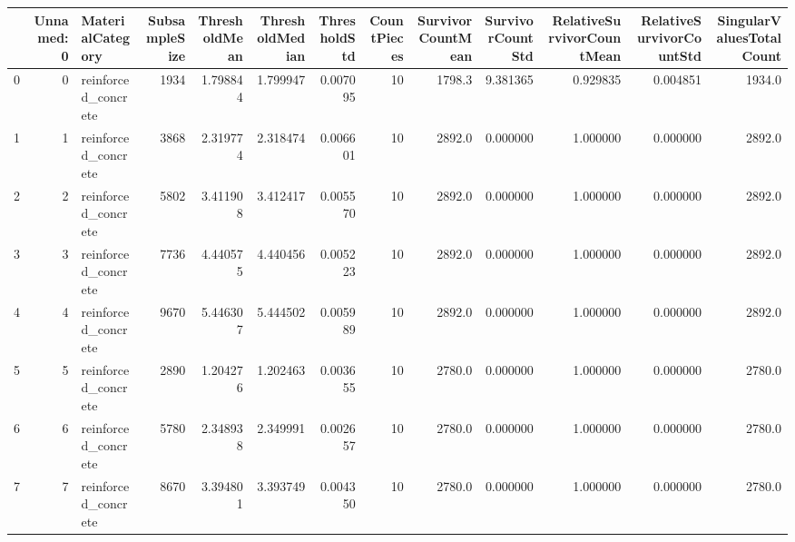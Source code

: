 \begin{tabular}{lrlrrrrrrrrrr}
\toprule
{} &  Unnamed: 0 &     MaterialCategory &  SubsampleSize &  ThresholdMean &  ThresholdMedian &  ThresholdStd &  CountPieces &  SurvivorCountMean &  SurvivorCountStd &  RelativeSurvivorCountMean &  RelativeSurvivorCountStd &  SingularValuesTotalCount \\
\midrule
0  &           0 &  reinforced\_concrete &           1934 &       1.798844 &         1.799947 &      0.007095 &           10 &             1798.3 &          9.381365 &                   0.929835 &                  0.004851 &                    1934.0 \\
1  &           1 &  reinforced\_concrete &           3868 &       2.319774 &         2.318474 &      0.006601 &           10 &             2892.0 &          0.000000 &                   1.000000 &                  0.000000 &                    2892.0 \\
2  &           2 &  reinforced\_concrete &           5802 &       3.411908 &         3.412417 &      0.005570 &           10 &             2892.0 &          0.000000 &                   1.000000 &                  0.000000 &                    2892.0 \\
3  &           3 &  reinforced\_concrete &           7736 &       4.440575 &         4.440456 &      0.005223 &           10 &             2892.0 &          0.000000 &                   1.000000 &                  0.000000 &                    2892.0 \\
4  &           4 &  reinforced\_concrete &           9670 &       5.446307 &         5.444502 &      0.005989 &           10 &             2892.0 &          0.000000 &                   1.000000 &                  0.000000 &                    2892.0 \\
5  &           5 &  reinforced\_concrete &           2890 &       1.204276 &         1.202463 &      0.003655 &           10 &             2780.0 &          0.000000 &                   1.000000 &                  0.000000 &                    2780.0 \\
6  &           6 &  reinforced\_concrete &           5780 &       2.348938 &         2.349991 &      0.002657 &           10 &             2780.0 &          0.000000 &                   1.000000 &                  0.000000 &                    2780.0 \\
7  &           7 &  reinforced\_concrete &           8670 &       3.394801 &         3.393749 &      0.004350 &           10 &             2780.0 &          0.000000 &                   1.000000 &                  0.000000 &                    2780.0 \\

\end{tabular}
